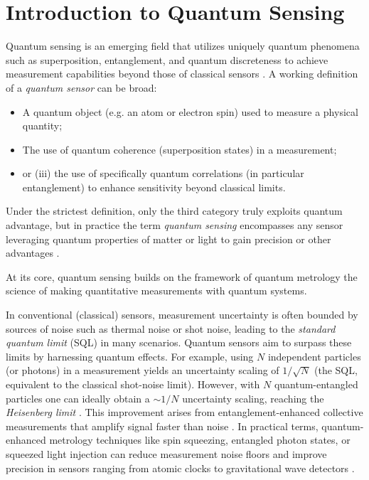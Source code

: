 

\chapter{Introduction to Quantum Sensing}

Quantum sensing is an emerging field that utilizes uniquely quantum
phenomena such as superposition, entanglement, and quantum
discreteness to achieve measurement capabilities beyond those of
classical sensors . A working definition of a \emph{quantum sensor}
can be broad:
\begin{itemize}
\item A quantum object (e.g. an atom or electron spin) used to measure a physical quantity;
\item The use of quantum coherence (superposition states) in a measurement;
\item or (iii) the use of specifically quantum correlations (in particular entanglement) to enhance
  sensitivity beyond classical limits.
\end{itemize}


Under the strictest definition, only the third category truly exploits
quantum advantage, but in practice the term {\em quantum sensing}
encompasses any sensor leveraging quantum properties of matter or
light to gain precision or other advantages .



At its core, quantum sensing builds on the framework of quantum
metrology the science of making quantitative measurements with quantum
systems.

In conventional (classical) sensors, measurement uncertainty
is often bounded by sources of noise such as thermal noise or shot
noise, leading to the \textit{standard quantum limit} (SQL) in many
scenarios. Quantum sensors aim to surpass these limits by harnessing
quantum effects. For example, using $N$ independent particles (or
photons) in a measurement yields an uncertainty scaling of
$1/\sqrt{N}$ (the SQL, equivalent to the classical shot-noise
limit). However, with $N$ quantum-entangled particles one can ideally
obtain a $\sim 1/N$ uncertainty scaling, reaching the \emph{Heisenberg
limit} . This improvement arises from entanglement-enhanced collective
measurements that amplify signal faster than noise . In practical
terms, quantum-enhanced metrology techniques like spin squeezing,
entangled photon states, or squeezed light injection can reduce
measurement noise floors and improve precision in sensors ranging from
atomic clocks to gravitational wave detectors .



